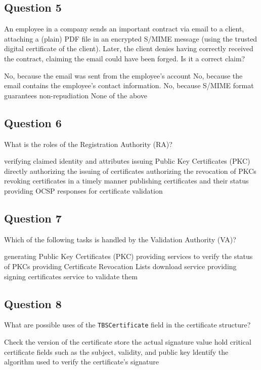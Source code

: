 \subsection*{Question 5}
An employee in a company sends an important contract via email to a client,
attaching a (plain) PDF file in an encrypted S/MIME message (using the trusted
digital certificate of the client). Later, the client denies having correctly
received the contract, claiming the email could have been forged. Is it a
correct claim?
\begin{itemize}
  \incorrect No, because the email was sent from the employee's account
  \incorrect No, because the email contains the employee's contact information.
  \incorrect No, because S/MIME format guarantees non-repudiation 
  \correct None of the above
\end{itemize}
\subsection*{Question 6}
What is the roles of the Registration Authority (RA)? 
\begin{itemize}
  \correct verifying claimed identity and attributes
  \incorrect issuing Public Key Certificates (PKC) directly
  \correct authorizing the issuing of certificates
  \incorrect authorizing the revocation of PKCs
  \incorrect revoking certificates in a timely manner
  \incorrect publishing certificates and their status
  \incorrect providing OCSP responses for certificate validation
\end{itemize}

\subsection*{Question 7}
Which of the following tasks is handled by the Validation Authority (VA)?
\begin{itemize}
  \incorrect generating Public Key Certificates (PKC)
  \correct providing services to verify the status of PKCs
  \correct providing Certificate Revocation Lists download service 
  \incorrect providing signing certificates service to validate them
\end{itemize}
\subsection*{Question 8}
What are possible uses of the \texttt{TBSCertificate} field in the certificate
structure?
\begin{itemize}
  \incorrect Check the version of the certificate 
  \incorrect store the actual signature value
  \incorrect hold critical certificate fields such as the subject, validity,
  and public key
  \incorrect ldentify the algorithm used to verify the certificate's signature
\end{itemize}

